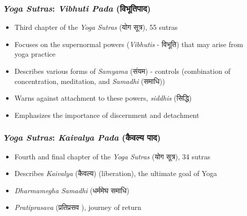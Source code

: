 \begin{frame}[fragile]\frametitle{\textit{Yoga Sutras}: \textit{Vibhuti Pada} (विभूतिपाद)}

    \begin{itemize}
        \item Third chapter of the \textit{Yoga Sutras} (योग सूत्र), 55 sutras
        \item Focuses on the supernormal powers (\textit{Vibhutis} - विभूति) that may arise from yoga practice
        \item Describes various forms of \textit{Samyama} (संयम) - controls (combination of concentration, meditation, and \textit{Samadhi} (समाधि))
        \item Warns against attachment to these powers, \textit{siddhis} (सिद्धि)
        \item Emphasizes the importance of discernment and detachment
    \end{itemize}

\end{frame}


\begin{frame}[fragile]\frametitle{\textit{Yoga Sutras}: \textit{Kaivalya Pada} (कैवल्य पाद)}

    \begin{itemize}
        \item Fourth and final chapter of the \textit{Yoga Sutras} (योग सूत्र), 34 sutras
        \item Describes \textit{Kaivalya} (कैवल्य) (liberation), the ultimate goal of Yoga
        \item \textit{Dharmamegha Samadhi} (धर्ममेघ समाधि)
        \item \textit{Pratiprasava} (प्रतिप्रसव ), journey of return
    \end{itemize}

\end{frame}


